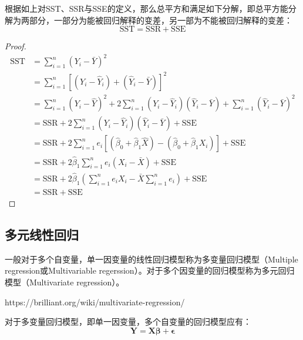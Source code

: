 \documentclass[11pt]{article}
\begin{document}
\begin{property}
    根据如上对SST、SSR与SSE的定义，那么总平方和满足如下分解，即总平方能分解为两部分，一部分为能被回归解释的变差，另一部为不能被回归解释的变差：
    \begin{equation*}
        \text{SST} = \text{SSR} + \text{SSE}
    \end{equation*}
\end{property}

\begin{proof}
    \begin{align*}
        \text{SST} &= \sum_{i=1}^{n} \left(Y_i - \bar{Y}\right)^2 \\
        &= \sum_{i=1}^{n} \left[(Y_i - \hat{Y}_i) + (\hat{Y}_i - \bar{Y})\right]^2 \\
        &= \sum_{i=1}^{n} \left(Y_i - \hat{Y}\right)^2
        + 2\sum_{i=1}^{n} \left(Y_i - \hat{Y}_i\right)\left(\hat{Y}_i - \bar{Y}\right)
        + \sum_{i=1}^{n} \left(\hat{Y}_i - \bar{Y}\right)^2 \\
        &= \text{SSR} + 2\sum_{i=1}^{n} \left(Y_i - \hat{Y}_i\right)\left(\hat{Y}_i - \bar{Y}\right) + \text{SSE} \\
        &= \text{SSR} + 2\sum_{i=1}^{n} e_i \left[(\hat{\beta}_0 + \hat{\beta}_1 \hat{X}) - (\hat{\beta}_0 + \hat{\beta}_1 X_i)\right] + \text{SSE} \\
        &= \text{SSR} + 2\hat{\beta}_1 \sum_{i=1}^{n} e_i \left(X_i-\bar{X}\right) + \text{SSE} \\
        &= \text{SSR} + 2\hat{\beta}_1 \left(\sum_{i=1}^{n} e_i X_i - \bar{X}\sum_{i=1}^{n}e_i\right) + \text{SSE} \\
        &= \text{SSR} + \text{SSE}
    \end{align*}
\end{proof}


\subsection{多元线性回归}

一般对于多个自变量，单一因变量的线性回归模型称为多变量回归模型（Multiple regression或Multivariable regerssion）。对于多个因变量的回归模型称为多元回归模型（Multivariate regression）。

https://brilliant.org/wiki/multivariate-regression/


对于多变量回归模型，即单一因变量，多个自变量的回归模型应有：
\begin{equation*}
    \bm{Y = X \beta + \epsilon}
\end{equation*}
\end{document}
